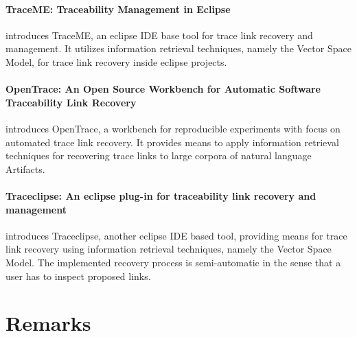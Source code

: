 
\paragraph*{TraceME: Traceability Management in Eclipse}
\cite{TraceME}
introduces TraceME, an eclipse \gls{IDE} base tool for trace link recovery and management.
It utilizes information retrieval techniques, namely the Vector Space Model, for trace link recovery inside eclipse projects.

\paragraph*{OpenTrace: An Open Source Workbench for Automatic Software Traceability Link Recovery}
\cite{OpenTrace}
introduces OpenTrace, a workbench for reproducible experiments with focus on automated trace link recovery.
It provides means to apply information retrieval techniques for recovering trace links to large corpora of natural language \glspl{Artifact}.

\paragraph*{Traceclipse: An eclipse plug-in for traceability link recovery and management}
\cite{Traceclipse}
introduces Traceclipse, another eclipse \gls{IDE} based tool, providing means for trace link recovery using information retrieval techniques, namely the Vector Space Model.
The implemented recovery process is semi-automatic in the sense that a user has to inspect proposed links.


\section{Remarks}
\label{section:Remarks}



